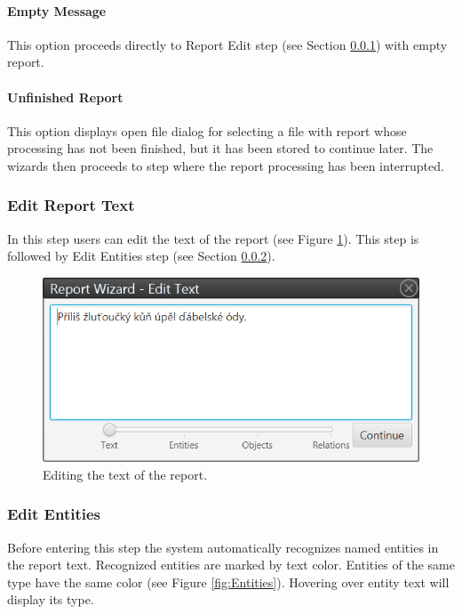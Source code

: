 \paragraph{Empty Message} This option proceeds directly to Report Edit step
(see Section \ref{sssec:ReportEdit}) with empty report.

\paragraph{Unfinished Report} This option displays open file dialog for
selecting a file with report whose processing has not been finished, but it
has been stored to continue later. The wizards then proceeds to step where
the report processing has been interrupted.

\subsubsection{Edit Report Text}
\label{sssec:ReportEdit}

In this step users can edit the text of the report (see Figure
\ref{fig:ReportEdit}). This step is followed by Edit Entities step (see Section
\ref{sssec:EditEntities}).

\begin{figure}[!htb]
        \centering
        \includegraphics[width=\textwidth]{Images/reportedit}
        \caption{Editing the text of the report.}
        \label{fig:ReportEdit}
\end{figure}

\subsubsection{Edit Entities}
\label{sssec:EditEntities}

Before entering this step the system automatically recognizes named entities
in the report text. Recognized entities are marked by text color. Entities of
the same type have the same color (see Figure \ref{fig:Entities}). Hovering over
entity text will display its type.

